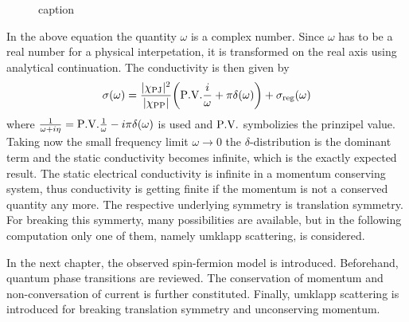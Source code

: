 %
\begin{figure}[t]
	\caption{caption}
	\label{fig:conductivity broken and unbroken translation symmetry}
\end{figure}
%
In the above equation the quantity $\omega$ is a complex number.
Since $\omega$ has to be a real number for a physical interpetation, it is transformed on the real axis using analytical continuation.
The conductivity is then given by
%
\begin{align}
	\sigma(\omega) = \frac{\vert\chi_{\mt{PJ}}\vert^{2}}{\vert\chi_{\mt{PP}}\vert} \bigg(\PV{\frac{i}{\omega}} + \pi \delta(\omega) \bigg) + \sigma_{\mt{reg}}(\omega)
	\label{eq:conductivity unpertubed system}
\end{align}
%
where $\frac{1}{\omega + i\eta} = \PV{\frac{1}{\omega}} - i\pi\delta(\omega)$ is used and $\PV$ symbolizies the prinzipel value.
Taking now the small frequency limit $\omega \to 0$ the $\delta$-distribution is the dominant term and the static conductivity becomes infinite, which is the exactly expected result.
The static electrical conductivity is infinite in a momentum conserving system, thus conductivity is getting finite if the momentum is not a conserved quantity any more.
The respective underlying symmetry is translation symmetry.
For breaking this symmerty, many possibilities are available, but in the following computation only one of them, namely umklapp scattering, is considered.

In the next chapter, the observed spin-fermion model is introduced.
Beforehand, quantum phase transitions are reviewed.
The conservation of momentum and non-conversation of current is further constituted.
Finally, umklapp scattering is introduced for breaking translation symmetry and unconserving momentum.
























